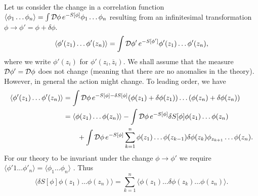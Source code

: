 Let us consider the change in a correlation function $\langle \phi_1 \dots \phi_n \rangle = \int \mathop{\mathcal{D} \phi} e^{-S[\phi]} \phi_1 \dots \phi_n$ resulting from an infinitesimal transformation $\phi \to \phi' = \phi + \delta \phi$.
\begin{equation}
  \langle \phi'(z_1) \dots \phi'(z_n) \rangle = \int \mathop{\mathcal{D} \phi'} e^{-S[\phi']} \phi'(z_1) \dots \phi'(z_n),
\end{equation}
where we write $\phi'(z_i)$ for $\phi'(z_i, \overline{z}{}_i)$.
We shall assume that the measure $\mathop{\mathcal{D} \phi'} = \mathop{\mathcal{D} \phi}$ does not change (meaning that there are no anomalies in the theory).
However, in general the action might change. To leading order, we have
\begin{align}
    \langle \phi'(z_1) \dots\phi'(z_n) \rangle &= \int \mathop{\mathcal{D} \phi} e^{-S[\phi] - \delta S[\phi]} (\phi(z_1) + \delta \phi(z_1)) \dots (\phi(z_n) + \delta \phi(z_n)) \\
					       &= \langle \phi(z_1) \dots \phi(z_n) \rangle - \int \mathop{\mathcal{D} \phi} e^{-S[\phi]} \delta S[\phi] \phi(z_1) \dots \phi(z_n) \\
					       & \qquad + \int \mathop{\mathcal{D} \phi} e^{-S[\phi]} \sum_{k=1}^{n} \phi(z_1) \dots \phi(z_{k-1}) \delta \phi(z_k) \phi_{z_{k+1}} \dots \phi(z_n).
\end{align}
For our theory to be invariant under the change $\phi \to \phi'$ we require  $\langle \phi'1 \dots \phi'_n \rangle = \langle \phi_1 \dots \phi_n \rangle$ . Thus
\begin{equation}
  \langle \delta S[\phi] \phi(z_1) \dots \phi(z_n) \rangle = \sum_{k=1}^{n} \langle \phi(z_1) \dots \delta \phi(z_k) \dots \phi(z_n) \rangle.
\end{equation}
